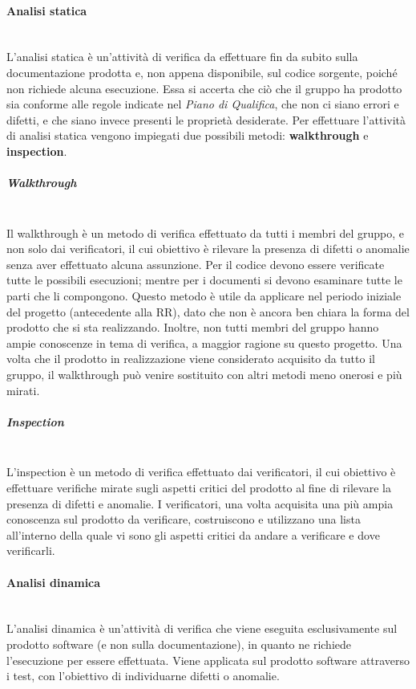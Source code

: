 \paragraph{Analisi statica} \mbox{}\\
L'analisi statica è un'attività di verifica da effettuare fin da subito sulla documentazione prodotta e, non appena disponibile, sul codice sorgente, poiché non richiede alcuna esecuzione.
Essa si accerta che ciò che il gruppo ha prodotto sia conforme alle regole indicate nel \textit{Piano di Qualifica}, che non ci siano errori e difetti, e che siano invece presenti le proprietà desiderate.
Per effettuare l’attività di analisi statica vengono impiegati due possibili metodi: \textbf{walkthrough} e \textbf{inspection}.
\setlength{\parindent}{-0.1em}
\subparagraph*{Walkthrough} \mbox{}\\ %
Il walkthrough è un metodo di verifica effettuato da tutti i membri del gruppo, e non solo dai verificatori, il cui obiettivo è rilevare la presenza di difetti o anomalie senza aver effettuato alcuna assunzione.
Per il codice devono essere verificate tutte le possibili esecuzioni; mentre per i documenti si devono esaminare tutte le parti che li compongono.
Questo metodo è utile da applicare nel periodo iniziale del progetto (antecedente alla RR), dato che non è ancora ben chiara la forma del prodotto che si sta realizzando.
Inoltre, non tutti membri del gruppo hanno ampie conoscenze in tema di verifica, a maggior ragione su questo progetto. Una volta che il prodotto in realizzazione viene considerato acquisito da tutto il gruppo, il walkthrough può venire sostituito con altri metodi meno onerosi e più mirati.
\subparagraph*{Inspection} \mbox{}\\
L'inspection è un metodo di verifica effettuato dai verificatori, il cui obiettivo è effettuare verifiche mirate sugli aspetti critici del prodotto al fine di rilevare la presenza di difetti e anomalie.
I verificatori, una volta acquisita una più ampia conoscenza sul prodotto da verificare, costruiscono e utilizzano una lista all’interno della quale vi sono gli aspetti critici da andare a verificare e dove verificarli.

\paragraph{Analisi dinamica} \mbox{}\\
L'analisi dinamica è un'attività di verifica che viene eseguita esclusivamente sul prodotto software (e non sulla documentazione), in quanto ne richiede l'esecuzione per essere effettuata.
Viene applicata sul prodotto software attraverso i test, con l’obiettivo di individuarne difetti o anomalie.

